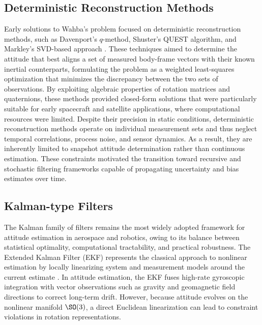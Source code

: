 \subsection{Deterministic Reconstruction Methods}
Early solutions to Wahba’s problem \cite{wahba1965least} focused on deterministic reconstruction methods, such as Davenport’s $q$-method, Shuster’s QUEST algorithm, and Markley’s SVD-based approach \cite{shuster1981three,markley1988attitude}. These techniques aimed to determine the attitude that best aligns a set of measured body-frame vectors with their known inertial counterparts, formulating the problem as a weighted least-squares optimization that minimizes the discrepancy between the two sets of observations. By exploiting algebraic properties of rotation matrices and quaternions, these methods provided closed-form solutions that were particularly suitable for early spacecraft and satellite applications, where computational resources were limited. Despite their precision in static conditions, deterministic reconstruction methods operate on individual measurement sets and thus neglect temporal correlations, process noise, and sensor dynamics. As a result, they are inherently limited to snapshot attitude determination rather than continuous estimation. These constraints motivated the transition toward recursive and stochastic filtering frameworks capable of propagating uncertainty and bias estimates over time.
\subsection{Kalman-type Filters}
The Kalman family of filters remains the most widely adopted framework for attitude estimation in aerospace and robotics, owing to its balance between statistical optimality, computational tractability, and practical robustness. The Extended Kalman Filter (EKF) represents the classical approach to nonlinear estimation by locally linearizing system and measurement models around the current estimate \cite{lefferts1982kalman,crassidis2007survey,barrau2017invariant,barrau2018invariant,Unscented_Julier_Uhlmann_1997_Aerosense,Unscented_Julier_Uhlmann_DurrantWhyte_ICRA_2000,Unscented_Crassidis_Markley_JGCD_2003,Unscented_Julier_Uhlmann_ProcIEEE_2004}. In attitude estimation, the EKF fuses high-rate gyroscopic integration with vector observations such as gravity and geomagnetic field directions to correct long-term drift. However, because attitude evolves on the nonlinear manifold $\SO(3)$, a direct Euclidean linearization can lead to constraint violations in rotation representations.


